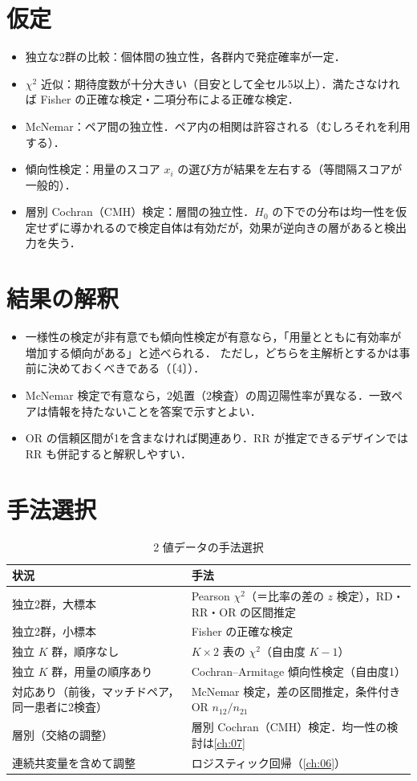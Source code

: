 \section{仮定}\label{sec:04-assump}
\begin{itemize}
\item 独立な2群の比較：個体間の独立性，各群内で発症確率が一定．
\item $\chi^2$ 近似：期待度数が十分大きい（目安として全セル5以上）．満たさなければ Fisher の正確な検定・二項分布による正確な検定．
\item McNemar：ペア間の独立性．ペア内の相関は許容される（むしろそれを利用する）．
\item 傾向性検定：用量のスコア $x_i$ の選び方が結果を左右する（等間隔スコアが一般的）．
\item 層別 Cochran（CMH）検定：層間の独立性．$H_0$ の下での分布は均一性を仮定せずに導かれるので検定自体は有効だが，効果が逆向きの層があると検出力を失う．
\end{itemize}

\section{結果の解釈}\label{sec:04-interp}
\begin{itemize}
\item 一様性の検定が非有意でも傾向性検定が有意なら，「用量とともに有効率が増加する傾向がある」と述べられる．
      ただし，どちらを主解析とするかは事前に決めておくべきである（〔4〕）．
\item McNemar 検定で有意なら，2処置（2検査）の周辺陽性率が異なる．一致ペアは情報を持たないことを答案で示すとよい．
\item OR の信頼区間が1を含まなければ関連あり．RR が推定できるデザインでは RR も併記すると解釈しやすい．
\end{itemize}

\section{手法選択}\label{sec:04-choice}
\begin{table}[htbp]
\centering\small
\caption{2 値データの手法選択}\label{tab:04-choice}
\begin{tabular}{@{}L{55mm}L{85mm}@{}}
\toprule
状況 & 手法\\
\midrule
独立2群，大標本 & Pearson $\chi^2$（＝比率の差の $z$ 検定），RD・RR・OR の区間推定\\
独立2群，小標本 & Fisher の正確な検定\\
独立 $K$ 群，順序なし & $K\times2$ 表の $\chi^2$（自由度 $K-1$）\\
独立 $K$ 群，用量の順序あり & Cochran--Armitage 傾向性検定（自由度1）\\
対応あり（前後，マッチドペア，同一患者に2検査） & McNemar 検定，差の区間推定，条件付きOR $n_{12}/n_{21}$\\
層別（交絡の調整） & 層別 Cochran（CMH）検定．均一性の検討は\cref{ch:07}\\
連続共変量を含めて調整 & ロジスティック回帰（\cref{ch:06}）\\
\bottomrule
\end{tabular}
\end{table}

